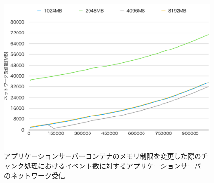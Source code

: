 \documentclass[../../../../../main]{subfiles}
\begin{document}
    \begin{figure}[H]
        \centering
        \includegraphics[width=12cm]{graph}
        \caption{アプリケーションサーバーコンテナのメモリ制限を変更した際のチャンク処理におけるイベント数に対するアプリケーションサーバーのネットワーク受信}
        \label{fig:stream-change-app-memory-limit-app-net-in-app_4_db_1_1024}
    \end{figure}
\end{document}
